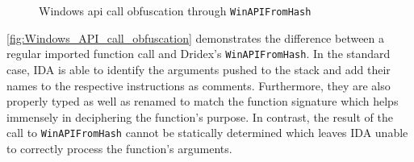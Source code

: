 \begin{figure}
    \centering
    \caption{Windows \gls{api} call obfuscation through \texttt{WinAPIFromHash\label{fig:Windows_API_call_obfuscation}}}
\end{figure}

\autoref{fig:Windows_API_call_obfuscation} demonstrates the difference between a regular imported function call and Dridex's \lstinline|WinAPIFromHash|.
In the standard case, IDA is able to identify the arguments pushed to the stack and add their names to the respective instructions as comments.
Furthermore, they are also properly typed as well as renamed to match the function signature which helps immensely in deciphering the function's purpose.
In contrast, the result of the call to \lstinline|WinAPIFromHash| cannot be statically determined which leaves IDA unable to correctly process the function's arguments.

